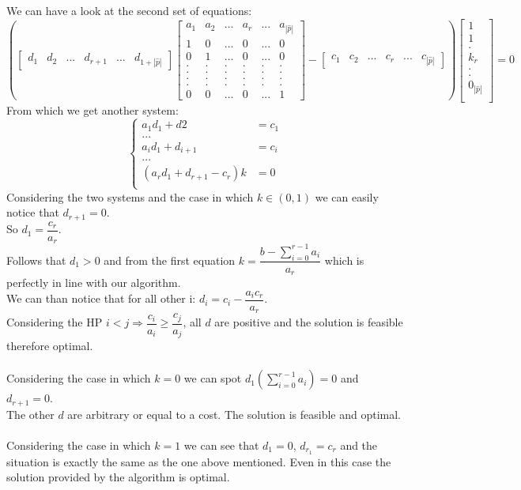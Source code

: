 \documentclass[1pt]{article}
\begin{document}
	We can have a look at the second set of equations:
	\[\left(\begin{bmatrix}
	d_1 & d_2 & ... & d_{r+1} & ... & d_{1+|\hat{p}|}
	\end{bmatrix}
	\begin{bmatrix}
	a_1 & a_2 & ... & a_r & ... & a_{|\hat{p}|}\\
	1   &  0  & ... & 0   & ... & 0\\
	0   &  1  & ... & 0   & ... & 0\\
	.   &  .  & . & .  & . & .\\
	.   &  .  & . & .  & . & .\\
	.   &  .  & . & .  & . & .\\
	.   &  .  & . & .  & . & .\\
	0   &  0  & ... & 0   & ... & 1
	\end{bmatrix}
	-
	\begin{bmatrix}
	c_1 & c_2 & ... & c_r & ... & c_{|\hat{p}|}
	\end{bmatrix}\right)
	\begin{bmatrix}
	1\\
	1\\
	.\\
	k_r\\
	.\\
	.\\
	0_{|\hat{p}|}\\
	\end{bmatrix}%
	 = 
	0
	\]
	From which we get another system:\\
	\[ \left\{\begin{aligned}
		a_1 d_1 + d2 & = c_1 \\
		...\\
		a_i d_1 + d_{i+1} & = c_i\\
		...\\
		(a_r d_1 + d_{r+1} -c_r)k & = 0\\
		\end{aligned}	\right.
	 \]%
	Considering the two systems and the case in which $k \in (0,1)$ we can easily notice that $d_{r+1}=0$. \\So $d_1 = \dfrac{c_r}{a_r}$. \\Follows that $d_1>0$ and from the first equation $k = \dfrac{b-\sum_{i=0}^{r-1} a_i}{a_r}$ which is perfectly in line with our algorithm.\\
	We can than notice that for all other i: $d_i = c_i - \dfrac{a_ic_r}{a_r}$.\\
	Considering the HP $i<j \Rightarrow \dfrac{c_i}{a_i} \geqslant \dfrac{c_j}{a_j}$, all $d$ are positive and the solution is feasible therefore optimal.\\\\
	Considering the case in which $k=0$ we can spot $d_1(\sum_{i=0}^{r-1} a_i)=0$ and $d_{r+1} = 0$.\\ The other $d$ are arbitrary or equal to a cost. The solution is feasible and optimal.\\\\
	Considering the case in which $k=1$ we can see that $d_1 = 0$, $d_{r_1} = c_r$ and the situation is exactly the same as the one above mentioned. Even in this case the solution provided by the algorithm is optimal.
\end{document}
